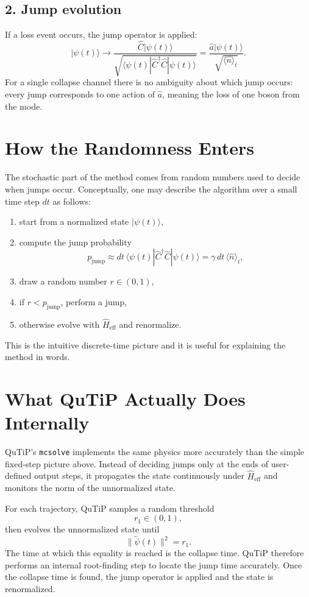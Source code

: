 \documentclass[12pt]{article}
\begin{document}
\subsection*{2. Jump evolution}
If a loss event occurs, the jump operator is applied:
\[
|\psi(t)\rangle \longrightarrow
\frac{\hat C|\psi(t)\rangle}{\sqrt{\langle \psi(t)|\hat C^\dagger \hat C|\psi(t)\rangle}}
= \frac{\hat a|\psi(t)\rangle}{\sqrt{\langle \hat n\rangle_t}}.
\]
For a single collapse channel there is no ambiguity about which jump occurs: every jump corresponds to one action of $\hat a$, meaning the loss of one boson from the mode.

\section*{How the Randomness Enters}
The stochastic part of the method comes from random numbers used to decide when jumps occur. Conceptually, one may describe the algorithm over a small time step $dt$ as follows:
\begin{enumerate}
\item start from a normalized state $|\psi(t)\rangle$,
\item compute the jump probability
\[
p_{\mathrm{jump}} \approx dt\,\langle \psi(t)|\hat C^\dagger \hat C|\psi(t)\rangle
= \gamma\,dt\,\langle \hat n\rangle_t,
\]
\item draw a random number $r\in(0,1)$,
\item if $r<p_{\mathrm{jump}}$, perform a jump,
\item otherwise evolve with $\hat H_{\mathrm{eff}}$ and renormalize.
\end{enumerate}

This is the intuitive discrete-time picture and it is useful for explaining the method in words.

\section*{What QuTiP Actually Does Internally}
QuTiP's \texttt{mcsolve} implements the same physics more accurately than the simple fixed-step picture above. Instead of deciding jumps only at the ends of user-defined output steps, it propagates the state continuously under $\hat H_{\mathrm{eff}}$ and monitors the norm of the unnormalized state.

For each trajectory, QuTiP samples a random threshold
\[
r_1 \in (0,1),
\]
then evolves the unnormalized state until
\[
\|\tilde\psi(t)\|^2 = r_1.
\]
The time at which this equality is reached is the collapse time. QuTiP therefore performs an internal root-finding step to locate the jump time accurately. Once the collapse time is found, the jump operator is applied and the state is renormalized.
\end{document}
